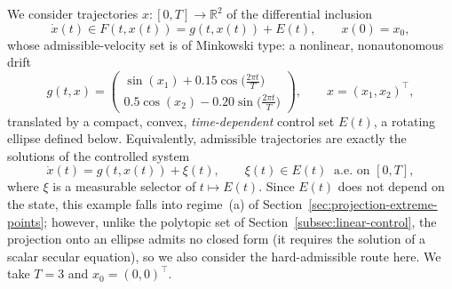 \documentclass[11pt]{elsarticle}
\theoremstyle{definition}
\theoremstyle{remark}
\numberwithin{equation}{section}
\begin{document}
We consider trajectories $x:[0,T]\to\mathbb{R}^2$ of the differential
inclusion
\begin{equation}
	\label{eq:ellipse-inclusion}
	\dot{x}(t)\in F(t,x(t)) = g(t,x(t))+E(t),
	\qquad x(0)=x_0,
\end{equation}
whose admissible-velocity set is of Minkowski type: a nonlinear,
nonautonomous drift
\begin{equation}
	\label{eq:ellipse-drift}
	g(t,x)=
	\begin{pmatrix}
		\sin(x_1)+0.15\cos\bigl(\tfrac{2\pi t}{T}\bigr)\\[2mm]
		0.5\cos(x_2)-0.20\sin\bigl(\tfrac{2\pi t}{T}\bigr)
	\end{pmatrix},
	\qquad x=(x_1,x_2)^{\top},
\end{equation}
translated by a compact, convex, \emph{time-dependent} control set
$E(t)$, a rotating ellipse defined below. Equivalently, admissible
trajectories are exactly the solutions of the controlled system
\begin{equation}
	\label{eq:ellipse-controlled}
	\dot{x}(t)=g(t,x(t))+\xi(t),
	\qquad \xi(t)\in E(t)\ \text{ a.e.\ on } [0,T],
\end{equation}
where $\xi$ is a measurable selector of $t\mapsto E(t)$. Since
$E(t)$ does not depend on the state, this example falls into
regime~(a) of Section~\ref{sec:projection-extreme-points}; however,
unlike the polytopic set of Section~\ref{subsec:linear-control}, the
projection onto an ellipse admits no closed form (it requires the
solution of a scalar secular equation), so we also consider the
hard-admissible route here. We take $T=3$ and $x_0=(0,0)^{\top}$.
\end{document}
